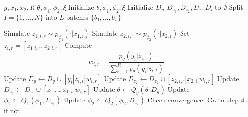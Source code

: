 \documentclass{article}
\begin{document}
\begin{algorithm}[H]
\caption{SEMF Training: two input sources}
\label{algo:semf-train}
\begin{algorithmic}[1]
\REQUIRE \( y, x_1, x_2, R \)
\ENSURE \( \theta, \phi_1, \phi_2, \xi \)
\STATE Initialize \( \theta, \phi_1, \phi_2, \xi \)
\STATE Initialize \( D_y, D_{z_1}, D_{z_2}, D_x, D_i \) to \( \emptyset \)
\STATE Split \( I = \{1, \ldots, N\} \) into \( L \) batches \( \{b_1, \ldots, b_L\} \)

                \STATE Simulate \( z_{1,i,r} \sim p_{\phi_1}(\cdot | x_{1,i}) \)
                \STATE Simulate \( z_{2,i,r} \sim p_{\phi_2}(\cdot | x_{2,i}) \)
                \STATE Set \( z_{i,r} = [z_{1,i,r}, z_{2,i,r}] \)
            \ENDFOR
            \STATE Compute 
            \[ w_{i,r} = \frac{p_{\theta}(y_i | z_{i,r})}{\sum_{t=1}^R p_{\theta}(y_i | z_{i,t})} \]
            \STATE Update \( D_y \leftarrow D_y \cup [y_i | z_{i,r} | w_{i,r}] \)
            \STATE Update \( D_{z_2} \leftarrow D_{z_2} \cup [z_{2,i,r} | x_{2,i} | w_{i,r}] \)
                \STATE Update \( D_{z_1} \leftarrow D_{z_1} \cup [z_{1,i,r} | x_{1,i} | w_{i,r}] \)
        \ENDFOR
        \STATE Update \( \theta \leftarrow Q_y(\theta, D_y) \)
        \STATE Update \( \phi_1 \leftarrow Q_1(\phi_1, D_{z_1}) \)
        \STATE Update \( \phi_2 \leftarrow Q_2(\phi_2, D_{z_2}) \)
    \ENDFOR
\ENDFOR
\STATE Check convergence; Go to step 4 if not
\end{algorithmic}
\end{algorithm}
\end{document}
